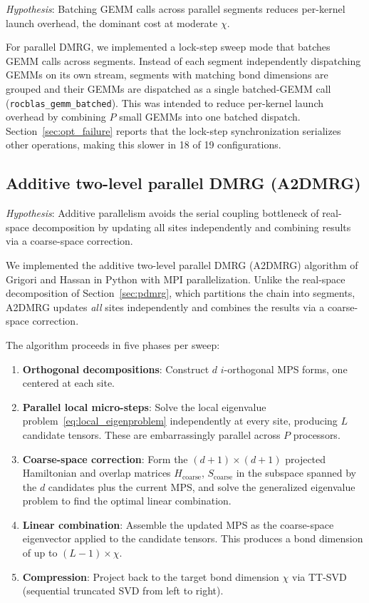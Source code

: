 \documentclass[preprint,12pt]{elsarticle}
\begin{document}
\emph{Hypothesis}: Batching GEMM calls across parallel segments reduces per-kernel launch overhead, the dominant cost at moderate $\chi$.

For parallel DMRG, we implemented a lock-step sweep mode that batches GEMM calls across segments.
Instead of each segment independently dispatching GEMMs on its own stream, segments with matching bond dimensions are grouped and their GEMMs are dispatched as a single batched-GEMM call (\texttt{rocblas\_gemm\_\allowbreak batched}).
This was intended to reduce per-kernel launch overhead by combining $P$ small GEMMs into one batched dispatch.
Section~\ref{sec:opt_failure} reports that the lock-step synchronization serializes other operations, making this slower in 18 of 19 configurations.

\subsection{Additive two-level parallel DMRG (A2DMRG)}
\label{sec:a2dmrg}

\emph{Hypothesis}: Additive parallelism avoids the serial coupling bottleneck of real-space decomposition by updating all sites independently and combining results via a coarse-space correction.

We implemented the additive two-level parallel DMRG (A2DMRG) algorithm of Grigori and Hassan \cite{Grigori2025} in Python with MPI parallelization.
Unlike the real-space decomposition of Section~\ref{sec:pdmrg}, which partitions the chain into segments, A2DMRG updates \emph{all} sites independently and combines the results via a coarse-space correction.

The algorithm proceeds in five phases per sweep:
\begin{enumerate}
  \item \textbf{Orthogonal decompositions}: Construct $d$ $i$-orthogonal MPS forms, one centered at each site.
  \item \textbf{Parallel local micro-steps}: Solve the local eigenvalue problem~\eqref{eq:local_eigenproblem} independently at every site, producing $L$ candidate tensors.  These are embarrassingly parallel across $P$ processors.
  \item \textbf{Coarse-space correction}: Form the $(d+1) \times (d+1)$ projected Hamiltonian and overlap matrices $H_\text{coarse}$, $S_\text{coarse}$ in the subspace spanned by the $d$ candidates plus the current MPS, and solve the generalized eigenvalue problem to find the optimal linear combination.
  \item \textbf{Linear combination}: Assemble the updated MPS as the coarse-space eigenvector applied to the candidate tensors.  This produces a bond dimension of up to $(L-1) \times \chi$.
  \item \textbf{Compression}: Project back to the target bond dimension $\chi$ via TT-SVD (sequential truncated SVD from left to right).
\end{enumerate}
\end{document}

